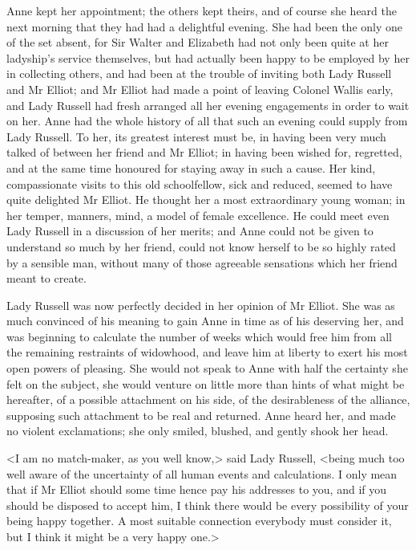 Anne kept her appointment; the others kept theirs, and of course she heard the next morning that they had had a delightful evening. She had been the only one of the set absent, for Sir Walter and Elizabeth had not only been quite at her ladyship's service themselves, but had actually been happy to be employed by her in collecting others, and had been at the trouble of inviting both Lady Russell and Mr Elliot; and Mr Elliot had made a point of leaving Colonel Wallis early, and Lady Russell had fresh arranged all her evening engagements in order to wait on her. Anne had the whole history of all that such an evening could supply from Lady Russell. To her, its greatest interest must be, in having been very much talked of between her friend and Mr Elliot; in having been wished for, regretted, and at the same time honoured for staying away in such a cause. Her kind, compassionate visits to this old schoolfellow, sick and reduced, seemed to have quite delighted Mr Elliot. He thought her a most extraordinary young woman; in her temper, manners, mind, a model of female excellence. He could meet even Lady Russell in a discussion of her merits; and Anne could not be given to understand so much by her friend, could not know herself to be so highly rated by a sensible man, without many of those agreeable sensations which her friend meant to create.

Lady Russell was now perfectly decided in her opinion of Mr Elliot. She was as much convinced of his meaning to gain Anne in time as of his deserving her, and was beginning to calculate the number of weeks which would free him from all the remaining restraints of widowhood, and leave him at liberty to exert his most open powers of pleasing. She would not speak to Anne with half the certainty she felt on the subject, she would venture on little more than hints of what might be hereafter, of a possible attachment on his side, of the desirableness of the alliance, supposing such attachment to be real and returned. Anne heard her, and made no violent exclamations; she only smiled, blushed, and gently shook her head.

<I am no match-maker, as you well know,> said Lady Russell, <being much too well aware of the uncertainty of all human events and calculations. I only mean that if Mr Elliot should some time hence pay his addresses to you, and if you should be disposed to accept him, I think there would be every possibility of your being happy together. A most suitable connection everybody must consider it, but I think it might be a very happy one.>

